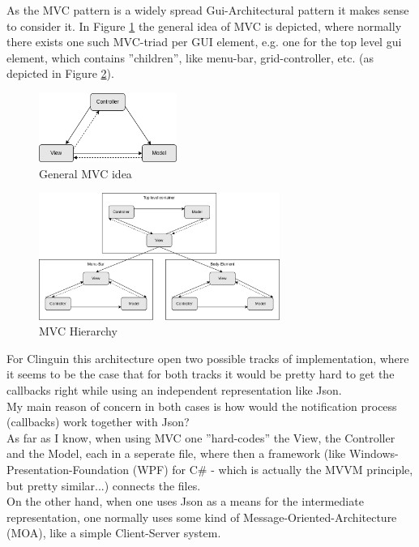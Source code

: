 \documentclass[12pt,a4paper]{article}
\newcommand{\<}[1]{\guilsinglleft}
\renewcommand{\>}[1]{\guilsinglright}
\begin{document}
\noindent As the MVC pattern is a widely spread Gui-Architectural pattern it makes sense to consider it. In Figure \ref{fig:mvc} the general idea of MVC is depicted, where normally there exists one such MVC-triad per GUI element, e.g. one for the top level gui element, which contains ''children'', like menu-bar, grid-controller, etc. (as depicted in Figure \ref{fig:mvc-hierarchy}).\\


\begin{figure}[ht]
    \begin{center}
    \includegraphics[width=0.4\textwidth]{imgs/mvc.png}
    \caption{General MVC idea}
    \label{fig:mvc}
    \end{center}
\end{figure}

\begin{figure}[ht]
    \begin{center}
    \includegraphics[width=0.7\textwidth]{imgs/mvc-architecture.png}
    \caption{MVC Hierarchy}
    \label{fig:mvc-hierarchy}
    \end{center}
\end{figure}

\noindent For Clinguin this architecture open two possible tracks of implementation, where it seems to be the case that for both tracks it would be pretty hard to get the callbacks right while using an independent representation like Json.\\[1em]
My main reason of concern in both cases is how would the notification process (callbacks) work together with Json?\\
As far as I know, when using MVC one ''hard-codes'' the View, the Controller and the Model, each in a seperate file, where then a framework (like Windows-Presentation-Foundation (WPF) for C\# - which is actually the MVVM principle, but pretty similar...) connects the files.\\
On the other hand, when one uses Json as a means for the intermediate representation, one normally uses some kind of Message-Oriented-Architecture (MOA), like a simple Client-Server system.\\
\end{document}

